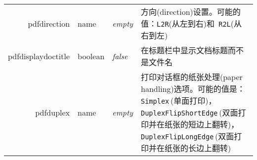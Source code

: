 \documentclass{article}
\begin{document}
\begin{longtable}{@{}>{\ttfamily}r>{\raggedright}p{}>{\itshape}lp{7cm}@{}}
  pdfdirection        & name           & empty                     & 方向(direction)设置。可能的值：\verb|L2R|(从左到右)和\verb| R2L|(从右到左)                                                                                                                                                                      \\
  pdfdisplaydoctitle  & boolean        & false                     & 在标题栏中显示文档标题而不是文件名                                                                                                                                                                                                            \\
  pdfduplex           & name           & empty                     & 打印对话框的纸张处理(paper handling)选项。可能的值是：
  \verb|Simplex|\,(单面打印)，
  \verb|DuplexFlipShortEdge|\,(双面打印并在纸张的短边上翻转)，
  \verb|DuplexFlipLongEdge|\,(双面打印并在纸张的长边上翻转)                                                                                                                                                                                                                                                     \\


\end{longtable}
\end{document}

